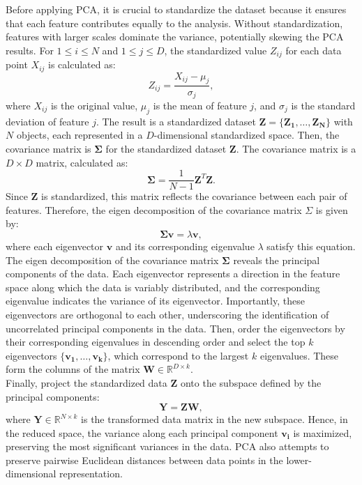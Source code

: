 \documentclass{article}\usepackage[]{graphicx}\usepackage[]{xcolor}
\numberwithin{equation}{section}
\begin{document}
{\noindent
Before applying PCA, it is crucial to standardize the dataset because it ensures that each feature contributes equally to the analysis. Without standardization, features with larger scales dominate the variance, potentially skewing the PCA results. For $1 \leq i \leq N$ and $1 \leq j \leq D$, the standardized value $Z_{ij}$ for each data point $X_{ij}$ is calculated as:
    \[Z_{ij} = \frac{X_{ij} - \mu_j}{\sigma_j},\]
where $X_{ij}$ is the original value, $\mu_j$ is the mean of feature $j$, and $\sigma_j$ is the standard deviation of feature $j$. The result is a standardized dataset $\mathbf{Z} = \{\mathbf{Z_1}, \dots, \mathbf{Z_N}\}$ with $N$ objects, each represented in a $D$-dimensional standardized space. Then, the covariance matrix is $\mathbf{\Sigma}$ for the standardized dataset $\mathbf{Z}$. The covariance matrix is a $D \times D$ matrix, calculated as:
    \[\mathbf{\Sigma} = \frac{1}{N-1} \mathbf{Z}^T \mathbf{Z}.\]
Since $\mathbf{Z}$ is standardized, this matrix reflects the covariance between each pair of features. Therefore, the eigen decomposition of the covariance matrix $\Sigma$ is given by:
    \[\mathbf{\Sigma} \mathbf{v} = \lambda \mathbf{v},\]
where each eigenvector $\mathbf{v}$ and its corresponding eigenvalue $\lambda$ satisfy this equation. The eigen decomposition of the covariance matrix $\mathbf{\Sigma}$ reveals the principal components of the data. Each eigenvector represents a direction in the feature space along which the data is variably distributed, and the corresponding eigenvalue indicates the variance of its eigenvector. Importantly, these eigenvectors are orthogonal to each other, underscoring the identification of uncorrelated principal components in the data. Then, order the eigenvectors by their corresponding eigenvalues in descending order and select the top $k$ eigenvectors $\{\mathbf{v_1}, \ldots, \mathbf{v_k}\}$, which correspond to the largest $k$ eigenvalues. These form the columns of the matrix $\mathbf{W} \in \mathbb{R}^{D \times k}$.\\

\noindent
Finally, project the standardized data $\mathbf{Z}$ onto the subspace defined by the principal components:
    \[\mathbf{Y} = \mathbf{Z}\mathbf{W},\]
where $\mathbf{Y} \in \mathbb{R}^{N \times k}$ is the transformed data matrix in the new subspace. Hence, in the reduced space, the variance along each principal component $\mathbf{v_i}$ is maximized, preserving the most significant variances in the data. PCA also attempts to preserve pairwise Euclidean distances between data points in the lower-dimensional representation. 

}
\end{document}
